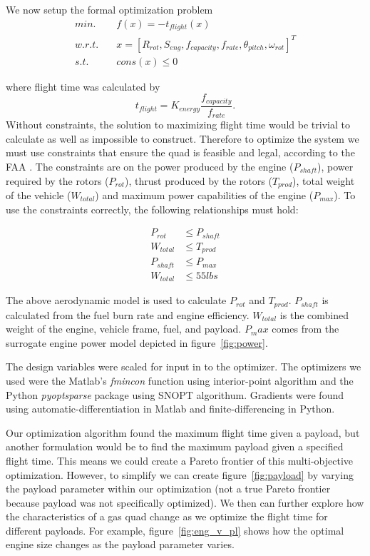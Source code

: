 \documentclass[letterpaper, 10 pt, conference]{ieeeconf}  %
\newcommand{\of}[1]{\ensuremath{\left(#1\right)}}
\begin{document}
We now setup the formal optimization problem
\begin{equation}
	\begin{split}
		min. & \quad f\of{x} = -t_{flight}\of{x} \\
		w.r.t. & \quad x = [R_{rot}, S_{eng}, f_{capacity}, f_{rate}, \theta_{pitch}, \omega_{rot}]^T \\
		s.t. & \quad cons\of{x} \leq 0 
	\end{split}
	\label{eq:objective}
\end{equation}

where flight time was calculated by 
\[
	t_{flight} = K_{energy}\frac{f_{capacity}}{f_{rate}}.
\]
Without constraints, the solution to maximizing flight time would be trivial to calculate as well as impossible to construct. Therefore to optimize the system we must use constraints that ensure the quad is feasible and legal, according to the FAA \cite{faa2016}. The constraints are on the power produced by the engine ($P_{shaft}$), power required by the rotors ($P_{rot}$), thrust produced by the rotors ($T_{prod}$), total weight of the vehicle ($W_{total}$) and maximum power capabilities of the engine ($P_{max}$). To use the constraints correctly, the following relationships must hold:

\[
	\begin{split}
	P_{rot} & \leq P_{shaft} \\
	W_{total} & \leq T_{prod} \\ 
	P_{shaft} & \leq P_{max} \\
	W_{total} & \leq 55 lbs
	\end{split}
\]

The above aerodynamic model is used to calculate $P_{rot}$ and $T_{prod}$. $P_{shaft}$ is calculated from the fuel burn rate and engine efficiency. $W_{total}$ is the combined weight of the engine, vehicle frame, fuel, and payload. $P_max$ comes from the surrogate engine power model depicted in figure~\ref{fig:power}.

The design variables were scaled for input in to the optimizer. The optimizers we used were the Matlab's \textit{fmincon} function using interior-point algorithm and the Python \textit{pyoptsparse} package using SNOPT algorithum. Gradients were found using automatic-differentiation in Matlab and finite-differencing in Python. 

Our optimization algorithm found the maximum flight time given a payload, but another formulation would be to find the maximum payload given a specified flight time. This means we could create a Pareto frontier of this multi-objective optimization. However, to simplify we can create figure~\ref{fig:payload} by varying the payload parameter within our optimization (not a true Pareto frontier because payload was not specifically optimized). We then can further explore how the characteristics of a gas quad change as we optimize the flight time for different payloads. For example, figure~\ref{fig:eng_v_pl} shows how the optimal engine size changes as the payload parameter varies. 
\end{document}
